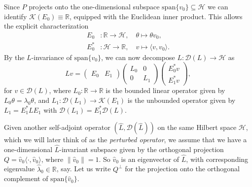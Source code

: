 \documentclass{aptpub}
\newcommand{\R}{\mathbb R}
\newcommand{\Dom}{\mathcal D}
\newcommand{\lspan}{\mathrm{span}}
\begin{document}
Since $P$ projects onto the one-dimensional subspace $\lspan\{v_0\} \subseteq \mathcal{H}$ we can
identify $\mathcal K(E_0) \equiv \R$, equipped with the Euclidean inner product. This allows the explicit characterization 
\begin{equation*}
    \begin{split}
        E_0&: \R \to \mathcal H, \quad \theta \mapsto \theta v_0,\\
        E_0^* &: \mathcal H \to \R,\quad v \mapsto \langle v, v_0\rangle.
    \end{split}
\end{equation*}
By the $L$-invariance of $\lspan\{v_0\}$, we can now decompose $L\colon \mathcal{D}(L) \to \mathcal{H}$ as
\begin{equation*}
    Lv = 
    \begin{pmatrix}
        E_0 & E_1
    \end{pmatrix}
    \begin{pmatrix}
        L_0 & 0 \\
        0 & L_1 
    \end{pmatrix}
    \begin{pmatrix}
        E_0^* v\\
        E_1^*v
    \end{pmatrix},
\end{equation*}
for $v\in \Dom(L)$, where $L_0:\R \to \R$ is the bounded linear operator given by $L_0\theta = \lambda_0 \theta$, and $L_1:\Dom(L_1)\to \mathcal K(E_1)$ is the unbounded operator given by $L_1 = E_1^* L E_1$ with $\Dom(L_1)=E_1^* \Dom(L)$.

Given another self-adjoint operator $(\widehat L, \Dom(\widehat L))$ on the same Hilbert space $\mathcal{H}$, which we will later think of as the \textit{perturbed operator}, we assume that we have a one-dimensional $\widehat L$-invariant subspace given by the orthogonal projection $Q = \widehat v_0 \langle \cdot, \widehat v_0\rangle$, where $\|\widehat v_0\|=1$. So $\widehat v_0$ is an eigenvector of $\widehat L$, with corresponding eigenvalue $\widehat{\lambda}_0\in\mathbb{R}$, say. Let us write $Q^{\perp}$ for the projection onto the orthogonal complement of $\lspan\{\widehat{v}_0\}$.
\end{document}
